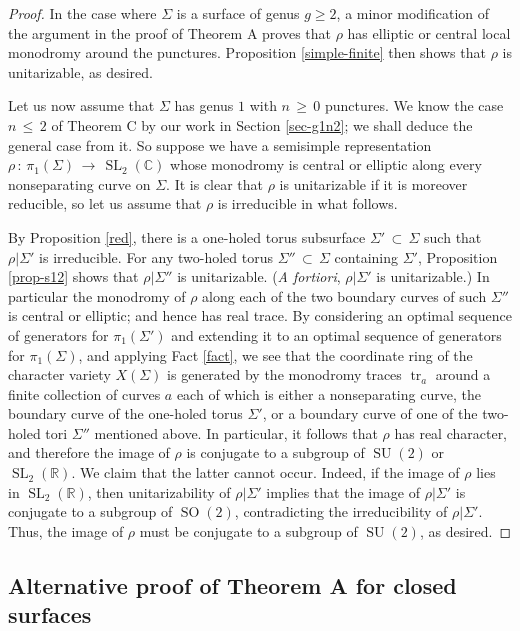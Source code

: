 \documentclass[reqno]{amsart}
\theoremstyle{plain}
\theoremstyle{definition}
\theoremstyle{remark}
\newcommand{\C}{{\mathbb{C}}}
\newcommand{\R}{{\mathbb{R}}}
\DeclareMathOperator{\SL}{SL}
\DeclareMathOperator{\SO}{SO}
\DeclareMathOperator{\SU}{SU}
\DeclareMathOperator{\tr}{tr}
\begin{document}
\begin{proof}
In the case where $\Sigma$ is a surface of genus $g\geq2$, a minor modification of the argument in the proof of 
Theorem A proves that $\rho$ has elliptic or central local monodromy around the punctures. Proposition 
\ref{simple-finite} then shows that $\rho$ is unitarizable, as desired.

Let us now assume that $\Sigma$ has genus $1$ with $n\,\geq\,0$ punctures. We know the case $n\,\leq\, 2$ of Theorem C 
by our work in Section \ref{sec-g1n2}; we shall deduce the general case from it. So suppose we have a 
semisimple representation $\rho\,:\,\pi_1(\Sigma)\,\to\,\SL_2(\C)$ whose monodromy is central or elliptic along every 
nonseparating curve on $\Sigma$. It is clear that $\rho$ is unitarizable if it is moreover reducible, so let us 
assume that $\rho$ is irreducible in what follows.

By Proposition \ref{red}, there is a one-holed torus subsurface $\Sigma'\,\subset\,\Sigma$ such that $\rho|\Sigma'$ 
is irreducible. For any two-holed torus $\Sigma''\,\subset\,\Sigma$ containing $\Sigma'$, Proposition 
\ref{prop-s12} shows that $\rho|\Sigma''$ is unitarizable. (\emph{A fortiori}, $\rho|\Sigma'$ is unitarizable.) In particular the monodromy of $\rho$ along each of the two boundary curves of such $\Sigma''$ is central or elliptic; and hence has real trace. 
By considering an optimal sequence of generators for $\pi_1(\Sigma')$ and extending it to an optimal sequence of generators for $\pi_1(\Sigma)$, and applying Fact \ref{fact}, we see that 
the coordinate ring of the character variety $X(\Sigma)$ is generated by the monodromy traces $\tr_a$ around a 
finite collection of curves $a$ each of which is either a nonseparating curve, the boundary curve of the one-holed torus $\Sigma'$, or a boundary curve of one of the two-holed tori $\Sigma''$ mentioned above. In particular, it follows that $\rho$ has real character, and therefore the image of $\rho$ is 
conjugate to a subgroup of $\SU(2)$ or $\SL_2(\R)$. We claim that the latter cannot occur. Indeed, if the 
image of $\rho$ lies in $\SL_2(\R)$, then unitarizability of $\rho|\Sigma'$ implies that the image of $\rho|\Sigma'$ is conjugate 
to a subgroup of $\SO(2)$, contradicting the irreducibility of $\rho|\Sigma'$. Thus, the image of $\rho$ must 
be conjugate to a subgroup of $\SU(2)$, as desired.
\end{proof}

\subsection{Alternative proof of Theorem A for closed surfaces}\label{sec:5.6}
\end{document}
